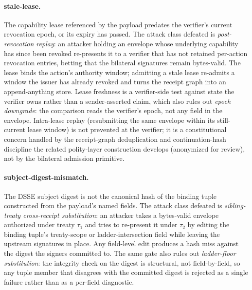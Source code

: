 \paragraph{stale-lease.} The capability lease referenced by the payload predates the verifier's current revocation epoch, or its expiry has passed. The attack class defeated is \emph{post-revocation replay}: an attacker holding an envelope whose underlying capability has since been revoked re-presents it to a verifier that has not retained per-action revocation entries, betting that the bilateral signatures remain bytes-valid. The lease binds the action's authority window; admitting a stale lease re-admits a window the issuer has already revoked and turns the receipt graph into an append-anything store. Lease freshness is a verifier-side test against state the verifier owns rather than a sender-asserted claim, which also rules out \emph{epoch downgrade}: the comparison reads the verifier's epoch, not any field in the envelope. Intra-lease replay (resubmitting the same envelope within its still-current lease window) is not prevented at the verifier; it is a constitutional concern handled by the receipt-graph deduplication and continuation-hash discipline the related polity-layer construction develops (anonymized for review), not by the bilateral admission primitive.

\paragraph{subject-digest-mismatch.} The DSSE subject digest is not the canonical hash of the binding tuple constructed from the payload's named fields. The attack class defeated is \emph{sibling-treaty cross-receipt substitution}: an attacker takes a bytes-valid envelope authorized under treaty $\tau_1$ and tries to re-present it under $\tau_2$ by editing the binding tuple's treaty-scope or ladder-intersection field while leaving the upstream signatures in place. Any field-level edit produces a hash miss against the digest the signers committed to. The same gate also rules out \emph{ladder-floor substitution}: the integrity check on the digest is structural, not field-by-field, so any tuple member that disagrees with the committed digest is rejected as a single failure rather than as a per-field diagnostic.

